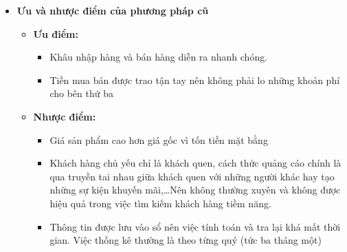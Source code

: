 \begin{itemize}
\begin{itemize}
	      \end{itemize}
	\item\textbf{Ưu và nhược điểm của phương pháp cũ}\par
	      \begin{itemize}
		      \item\textbf{Ưu điểm:}
		            \begin{itemize}
			            \item Khâu nhập hàng và bán hàng diễn ra nhanh chóng.
			            \item Tiền mua bán được trao tận tay nên không phải lo những khoản phí cho bên thứ ba
		            \end{itemize}
		      \item\textbf{Nhược điểm:}
		            \begin{itemize}
			            \item Giá sản phẩm cao hơn giá gốc vì tốn tiền mặt bằng
			            \item Khách hàng chủ yếu chỉ là khách quen, cách thức quảng cáo chính là qua truyền tai nhau giữa khách quen với những người khác hay tạo những sự kiện khuyến mãi,\dots Nên không thường xuyên và không được hiệu quả trong việc tìm kiếm khách hàng tiềm năng.
			            \item Thông tin được lưu vào sổ nên việc tính toán và tra lại khá mất thời gian. Việc thống kê thường là theo từng quý (tức ba tháng một)
		            \end{itemize}
	      \end{itemize}
\end{itemize}
